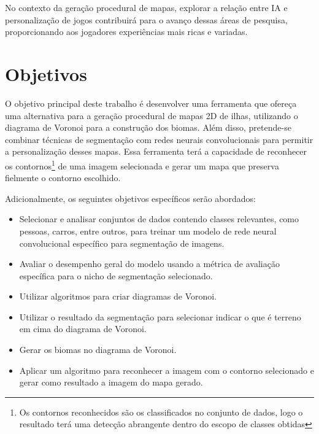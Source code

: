 No contexto da geração procedural de mapas, explorar a relação entre IA e personalização de jogos contribuirá para o avanço dessas áreas de pesquisa, proporcionando aos jogadores experiências mais ricas e variadas.



\section{Objetivos}

O objetivo principal deste trabalho é desenvolver uma ferramenta que ofereça uma alternativa para a geração procedural de mapas 2D de ilhas, utilizando o diagrama de Voronoi para a construção dos biomas. Além disso, pretende-se combinar técnicas de segmentação com redes neurais convolucionais para permitir a personalização desses mapas. Essa ferramenta terá a capacidade de reconhecer os contornos\footnote{Os contornos reconhecidos são os classificados no conjunto de dados, logo o resultado terá uma detecção abrangente dentro do escopo de classes obtidas} de uma imagem selecionada e gerar um mapa que preserva fielmente o contorno escolhido.

Adicionalmente, os seguintes objetivos específicos serão abordados:

\begin{itemize}
	\item Selecionar e analisar conjuntos de dados contendo classes relevantes, como pessoas, carros, entre outros, para treinar um modelo de rede neural convolucional específico para segmentação de imagens.
	\item Avaliar o desempenho geral do modelo usando a métrica de avaliação específica para o nicho de segmentação selecionado.
	\item Utilizar algoritmos para criar diagramas de Voronoi.
	\item Utilizar o resultado da segmentação para selecionar indicar o que é terreno em cima do diagrama de Voronoi.
	\item Gerar os biomas no diagrama de Voronoi.
	\item Aplicar um algoritmo para reconhecer a imagem com o contorno selecionado e gerar como resultado a imagem do mapa gerado.
\end{itemize}

